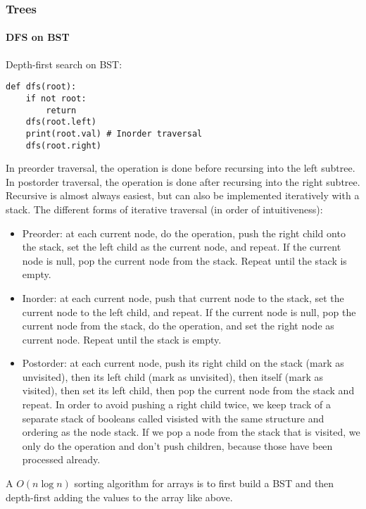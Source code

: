 \documentclass[8pt, table, xcdraw]{article}%
\begin{document}
\subsubsection{Trees}

\paragraph{DFS on BST}

Depth-first search on BST:

\begin{lstlisting}
def dfs(root):
    if not root:
        return    
    dfs(root.left)
    print(root.val) # Inorder traversal
    dfs(root.right)
\end{lstlisting}

In preorder traversal, the operation is done before recursing into the left subtree. In postorder traversal, the operation is done after recursing into the right subtree.\\
Recursive is almost always easiest, but can also be implemented iteratively with a stack. The different forms of iterative traversal (in order of intuitiveness):

\begin{itemize}
    \item Preorder: at each current node, do the operation, push the right child onto the stack, set the left child as the current node, and repeat. If the current node is null, pop the current node from the stack. Repeat until the stack is empty.
    \item Inorder: at each current node, push that current node to the stack, set the current node to the left child, and repeat. If the current node is null, pop the current node from the stack, do the operation, and set the right node as current node. Repeat until the stack is empty.
    \item Postorder: at each current node, push its right child on the stack (mark as unvisited), then its left child (mark as unvisited), then itself (mark as visited), then set its left child, then pop the current node from the stack and repeat. In order to avoid pushing a right child twice, we keep track of a separate stack of booleans called visisted with the same structure and ordering as the node stack. If we pop a node from the stack that is visited, we only do the operation and don't push children, because those have been processed already.
\end{itemize}

A $O(n \log n)$ sorting algorithm for arrays is to first build a BST and then depth-first adding the values to the array like above.
\end{document}
